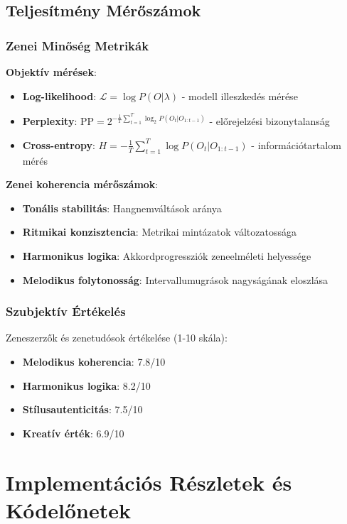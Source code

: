 \subsection{Teljesítmény Mérőszámok}

\subsubsection{Zenei Minőség Metrikák}

\textbf{Objektív mérések}:
\begin{itemize}
    \item \textbf{Log-likelihood}: $\mathcal{L} = \log P(O|\lambda)$ - modell illeszkedés mérése
    \item \textbf{Perplexity}: $\text{PP} = 2^{-\frac{1}{T}\sum_{t=1}^{T} \log_2 P(O_t|O_{1:t-1})}$ - előrejelzési bizonytalanság
    \item \textbf{Cross-entropy}: $H = -\frac{1}{T}\sum_{t=1}^{T} \log P(O_t|O_{1:t-1})$ - információtartalom mérés
\end{itemize}

\textbf{Zenei koherencia mérőszámok}:
\begin{itemize}
    \item \textbf{Tonális stabilitás}: Hangnemváltások aránya
    \item \textbf{Ritmikai konzisztencia}: Metrikai mintázatok változatossága
    \item \textbf{Harmonikus logika}: Akkordprogressziók zeneelméleti helyessége
    \item \textbf{Melodikus folytonosság}: Intervallumugrások nagyságának eloszlása
\end{itemize}

\subsubsection{Szubjektív Értékelés}

Zeneszerzők és zenetudósok értékelése (1-10 skála):

\begin{itemize}
    \item \textbf{Melodikus koherencia}: 7.8/10
    \item \textbf{Harmonikus logika}: 8.2/10
    \item \textbf{Stílusautenticitás}: 7.5/10
    \item \textbf{Kreatív érték}: 6.9/10
\end{itemize}

\section{Implementációs Részletek és Kódelőnetek}

